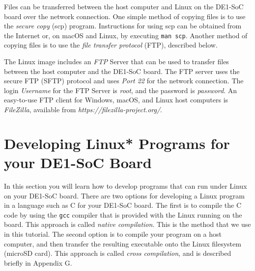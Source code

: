 \documentclass[11pt, twoside, pdftex]{article}
\begin{document}
Files can be transferred between the host computer and Linux on the DE1-SoC board over the
network connection. One simple method of copying files is to use the {\it secure copy} (scp)
program. Instructions for using scp can be obtained from the Internet or, on macOS and
Linux, by executing \texttt{man scp}. Another method of copying files is to use the 
{\it file transfer protocol} (FTP), described below.  

The Linux image includes an {\it FTP} Server that can be used to transfer files
between the host computer and the DE1-SoC board. The FTP server uses the secure FTP
(SFTP) protocol and uses {\it Port 22} for the network connection. The login 
{\it Username} for the FTP Server is {\it root}, and the password is {\it password}. An
easy-to-use FTP client for Windows, macOS, and Linux host computers is {\it FileZilla}, 
available from {\it https://filezilla-project.org/}.

\section{Developing Linux* Programs for your DE1-SoC Board}
\label{sec:linux_programs}

In this section you will learn how to develop programs that can run under Linux on 
your DE1-SoC board. There are two options for developing a Linux program in a language such
as C for your DE1-SoC board. The first is to compile the C code by using the \texttt{gcc}
compiler that is provided with the Linux running on the board. This approach is called 
\textit{native compilation}. This is the method that we use in this tutorial. The second option is 
to compile your program on a host computer, and then transfer the resulting executable onto 
the Linux filesystem (microSD card). This approach is called \textit{cross compilation}, and 
is described briefly in Appendix G.
\end{document}
